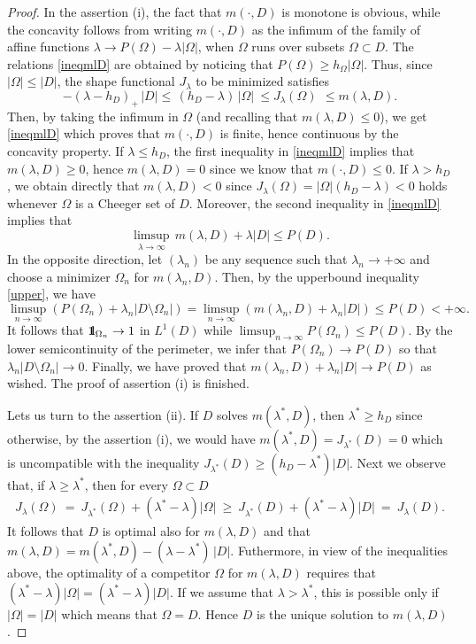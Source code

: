 \documentclass[reqno,11pt]{amsart}
\theoremstyle{definition}
\numberwithin{equation}{section}
\newcommand{\1}{{{\bf 1}\kern-0,28em\rm l}}
\newcommand{\one}{{{\bf 1}\kern-0,28em\rm l}}
\def\O{\Omega}
\def\l{\lambda}
\begin{document}
\begin{proof} In the assertion (i), the fact that $m(\cdot,D)$ is monotone is obvious, while the concavity follows from writing $m(\cdot,D)$ as the infimum of the family of affine functions $\l\to P(\O)-\l |\O|$,  when $\O$ runs over subsets $\O\subset D$. The relations \eqref{ineqmlD} are obtained by noticing that $P(\O) \ge h_\O |\O|$. Thus,
since $|\O|\le |D|$, the shape functional $J_\l$ to be minimized satisfies
\begin{equation}\label{ineqJ*}
- (\l- h_D)_+ \, |D| \le \, (h_D-\l) \, |\O|\ \le  J_\l(\O)\ \, \le m(\l,D) .
\end{equation}
  Then, by taking the infimum in $\O$ (and  recalling that $m(\l,D) \le 0$), we get \eqref{ineqmlD} which proves that $m(\cdot,D)$ is finite, hence continuous by the concavity property.
If $\l\le h_D$, the first inequality in \eqref{ineqmlD} implies that $m(\l,D) \ge 0$, hence   $m(\l,D)= 0$ since we know that  $m(\cdot,D)\le 0$. 
If $\l> h_D$, we obtain directly that $m(\l,D)<0$ since $J_\l(\O)= |\O| (h_D- \l) <0$ holds whenever $\O$ is a  Cheeger set of $D$. 
Moreover, the second inequality in \eqref{ineqmlD} implies that
 \begin{equation}\label{upper}
\limsup_{\l\to \infty}\,  m(\l,D) + \l |D|   \le P(D).
\end{equation}
In the opposite direction, let $(\l_n)$ be any sequence such that $\l_n\to +\infty$ and choose a minimizer $\O_n$ for $m(\l_n,D)$.
Then, by the upperbound inequality \eqref{upper}, we have
$$ \limsup_{n\to\infty} \left(P(\O_n)  + \l_n |D\setminus \O_n|\right) = \limsup_{n\to\infty} \left(m(\l_n,D)  + \l_n |D|\right) \le P(D) <+\infty . $$
It follows that $\one_{\O_n} \to 1$ in $L^1(D)$ while $\limsup_{n\to\infty} P(\O_n)\le P(D)$.  By the lower semicontinuity of the perimeter, we infer that
 $ P(\O_n) \to P(D)$  so that  $ \l_n |D\setminus \O_n| \to 0$. Finally, we have proved that
 $m(\l_n,D)  + \l_n |D|  \to P(D)$ as wished.
 The proof of assertion  (i) is finished.

\medskip
Lets us turn  to the assertion (ii).  If  $D$ solves $m(\lambda^*,D)$, then $\l^*\ge h_D$ since otherwise, by the assertion (i), we would have
$m(\l^*,D)= J_{\l^*}(D) =0$ which is uncompatible with the inequality $J_{\l^*}(D) \ge (h_D-\l^*) |D| $.  
Next we observe that, if $\l\ge \l^*$, then for every $\O\subset D$
\begin{align*}
J_\l(\O) \ =\ J_{ \l^*} (\O) + (\l^*-\l)|\O|
\ \ge\  J_{ \l^*} (D) + (\l^*-\l)|D|\  =\ J_\l(D) .
\end{align*}
It follows that $D$ is  optimal also for $m(\l,D)$ and that  $m(\l,D)= m(\l^*,D) - (\l-\l^*)\, |D|$.
Futhermore, in view of the inequalities above,  the optimality of a competitor  $\O$ for $m(\l,D)$  requires that $(\l^*-\l) |\O| = (\l^*-\l) |D|$.
If we assume that $\l>\l^*$, this is possible only if $|\O| = |D|$ which means that $\O=D$. Hence $D$ is the unique solution to $m(\l,D)$. 



\end{proof}
\end{document}
